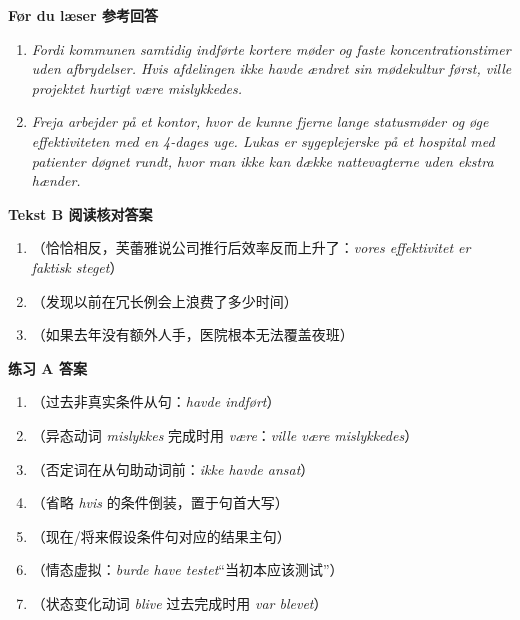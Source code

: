 \begin{answerbox}
\textbf{Før du læser 参考回答}
\begin{enumerate}
  \item \textit{Fordi kommunen samtidig indførte kortere møder og faste koncentrationstimer uden afbrydelser. Hvis afdelingen ikke havde ændret sin mødekultur først, ville projektet hurtigt være mislykkedes.}
  \item \textit{Freja arbejder på et kontor, hvor de kunne fjerne lange statusmøder og øge effektiviteten med en 4-dages uge. Lukas er sygeplejerske på et hospital med patienter døgnet rundt, hvor man ikke kan dække nattevagterne uden ekstra hænder.}
\end{enumerate}

\textbf{Tekst B 阅读核对答案}
\begin{enumerate}
  \item {}（恰恰相反，芙蕾雅说公司推行后效率反而上升了：\textit{vores effektivitet er faktisk steget}）
  \item {}（发现以前在冗长例会上浪费了多少时间）
  \item {}（如果去年没有额外人手，医院根本无法覆盖夜班）
\end{enumerate}

\textbf{练习 A 答案}
\begin{enumerate}
  \item {}（过去非真实条件从句：\textit{havde indført}）
  \item {}（异态动词 \textit{mislykkes} 完成时用 \textit{være}：\textit{ville være mislykkedes}）
  \item {}（否定词在从句助动词前：\textit{ikke havde ansat}）
  \item {}（省略 \textit{hvis} 的条件倒装，置于句首大写）
  \item {}（现在/将来假设条件句对应的结果主句）
  \item {}（情态虚拟：\textit{burde have testet}“当初本应该测试”）
  \item {}（状态变化动词 \textit{blive} 过去完成时用 \textit{var blevet}）
\end{enumerate}


\end{answerbox}
